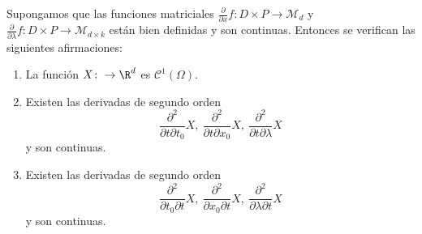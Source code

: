 \begin{theorem}
  \label{thm:-dev-param}
  Supongamos que las funciones matriciales
  $\frac{\partial}{\partial x}f \colon D \times P \to \mathcal{M}_d$ y
  $\frac{\partial}{\partial \lambda} f \colon D \times P \to \mathcal{M}_{d\times k}$ están bien
  definidas y son continuas. Entonces se verifican las siguientes afirmaciones:
  
  \begin{enumerate}
  \item La función $X \colon \to \R^d$ es $\mathcal{C}^1(\Omega)$.
  \item Existen las derivadas de segundo orden
    \[ \frac{\partial^2}{\partial t \partial t_0}X, \ \frac{\partial^2}{\partial t \partial x_0}X, \
      \frac{\partial^2}{\partial t \partial \lambda}X\] y son continuas.
  \item Existen las derivadas de segundo orden
    \[ \frac{\partial^2}{\partial t_0 \partial t}X, \ \frac{\partial^2}{\partial x_0 \partial t}X, \
      \frac{\partial^2}{\partial \lambda \partial t}X\] y son continuas.
  \end{enumerate}
\end{theorem}

